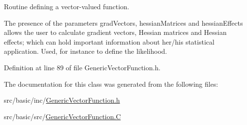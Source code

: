 Routine defining a vector-\/valued function. 

The presence of the parameters {\ttfamily grad\-Vectors}, {\ttfamily hessian\-Matrices} and {\ttfamily hessian\-Effects} allows the user to calculate gradient vectors, Hessian matrices and Hessian effects; which can hold important information about her/his statistical application. Used, for instance to define the likelihood. 

Definition at line 89 of file Generic\-Vector\-Function.\-h.



The documentation for this class was generated from the following files\-:\begin{DoxyCompactItemize}
\item 
src/basic/inc/\hyperlink{_generic_vector_function_8h}{Generic\-Vector\-Function.\-h}\item 
src/basic/src/\hyperlink{_generic_vector_function_8_c}{Generic\-Vector\-Function.\-C}\end{DoxyCompactItemize}
